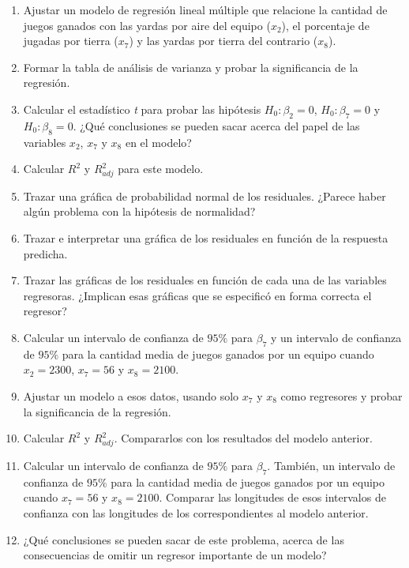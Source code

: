 \documentclass[
]{book}
\begin{document}
\begin{enumerate}
\def\labelenumi{\alph{enumi})}
\item
  Ajustar un modelo de regresión lineal múltiple que relacione la cantidad de juegos ganados con las yardas por aire del equipo (\(x_2\)), el porcentaje de jugadas por tierra (\(x_7\)) y las yardas por tierra del contrario (\(x_8\)).
\item
  Formar la tabla de análisis de varianza y probar la significancia de la regresión.
\item
  Calcular el estadístico \emph{t} para probar las hipótesis \(H_0 : \beta_2 = 0\), \(H_0 : \beta_7 = 0\) y \(H_0 : \beta_8 = 0\). ¿Qué conclusiones se pueden sacar acerca del papel de las variables \(x_2\), \(x_7\) y \(x_8\) en el modelo?
\item
  Calcular \(R^2\) y \(R^2_{adj}\) para este modelo.
\item
  Trazar una gráfica de probabilidad normal de los residuales. ¿Parece haber algún problema con la hipótesis de normalidad?
\item
  Trazar e interpretar una gráfica de los residuales en función de la respuesta predicha.
\item
  Trazar las gráficas de los residuales en función de cada una de las variables regresoras. ¿Implican esas gráficas que se especificó en forma correcta el regresor?
\item
  Calcular un intervalo de confianza de \(95\%\) para \(\beta_7\) y un intervalo de confianza de \(95\%\) para la cantidad media de juegos ganados por un equipo cuando \(x_2 = 2300\), \(x_7 = 56\) y \(x_8 = 2100\).
\item
  Ajustar un modelo a esos datos, usando solo \(x_7\) y \(x_8\) como regresores y probar la significancia de la regresión.
\item
  Calcular \(R^2\) y \(R^2_{adj}\). Compararlos con los resultados del modelo anterior.
\item
  Calcular un intervalo de confianza de \(95\%\) para \(\beta_7\). También, un intervalo de confianza de \(95\%\) para la cantidad media de juegos ganados por un equipo cuando \(x_7 = 56\) y \(x_8 = 2100\). Comparar las longitudes de esos intervalos de confianza con las longitudes de los correspondientes al modelo anterior.
\item
  ¿Qué conclusiones se pueden sacar de este problema, acerca de las consecuencias de omitir un regresor importante de un modelo?
\end{enumerate}
\end{document}
